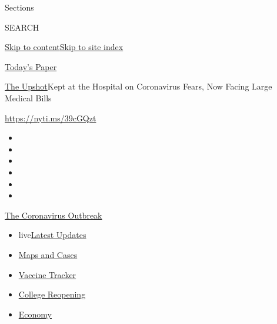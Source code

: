 Sections

SEARCH

\protect\hyperlink{site-content}{Skip to
content}\protect\hyperlink{site-index}{Skip to site index}

\href{https://myaccount.nytimes.com/auth/login?response_type=cookie\&client_id=vi}{}

\href{https://www.nytimes.com/section/todayspaper}{Today's Paper}

\href{/section/upshot}{The Upshot}\textbar{}Kept at the Hospital on
Coronavirus Fears, Now Facing Large Medical Bills

\url{https://nyti.ms/39cGQzt}

\begin{itemize}
\item
\item
\item
\item
\item
\item
\end{itemize}

\href{https://www.nytimes.com/news-event/coronavirus?action=click\&pgtype=Article\&state=default\&region=TOP_BANNER\&context=storylines_menu}{The
Coronavirus Outbreak}

\begin{itemize}
\tightlist
\item
  live\href{https://www.nytimes.com/2020/08/04/world/coronavirus-cases.html?action=click\&pgtype=Article\&state=default\&region=TOP_BANNER\&context=storylines_menu}{Latest
  Updates}
\item
  \href{https://www.nytimes.com/interactive/2020/us/coronavirus-us-cases.html?action=click\&pgtype=Article\&state=default\&region=TOP_BANNER\&context=storylines_menu}{Maps
  and Cases}
\item
  \href{https://www.nytimes.com/interactive/2020/science/coronavirus-vaccine-tracker.html?action=click\&pgtype=Article\&state=default\&region=TOP_BANNER\&context=storylines_menu}{Vaccine
  Tracker}
\item
  \href{https://www.nytimes.com/2020/08/02/us/covid-college-reopening.html?action=click\&pgtype=Article\&state=default\&region=TOP_BANNER\&context=storylines_menu}{College
  Reopening}
\item
  \href{https://www.nytimes.com/live/2020/08/04/business/stock-market-today-coronavirus?action=click\&pgtype=Article\&state=default\&region=TOP_BANNER\&context=storylines_menu}{Economy}
\end{itemize}

